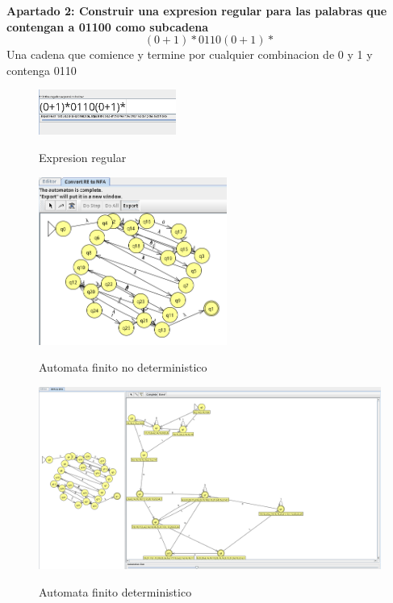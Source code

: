 \documentclass{article}
\begin{document}
        \vspace{\baselineskip} %
        \textbf{Apartado 2: Construir una expresion regular para las palabras que contengan a 01100 como subcadena }
         $$(0+1)*0110(0+1)*$$
        Una cadena que comience y termine por cualquier combinacion de 0 y 1 y contenga 0110

        \begin{figure}[!h]
            \centering
            \includegraphics[width=0.4\textwidth]{./Imagenes/image25.png}
            \label{fig:label4}
            \caption{Expresion regular}
        \end{figure}

        \begin{figure}[!h]
            \centering
            \includegraphics[width=0.55\textwidth]{./Imagenes/image26.png}
            \label{fig:label4}
            \caption{Automata finito no deterministico}
        \end{figure}

        \newpage

        \begin{figure}[!h]
            \centering
            \includegraphics[width=1.2\textwidth]{./Imagenes/image27.png}
            \label{fig:label4}
            \caption{Automata finito  deterministico}
        \end{figure}
\end{document}
